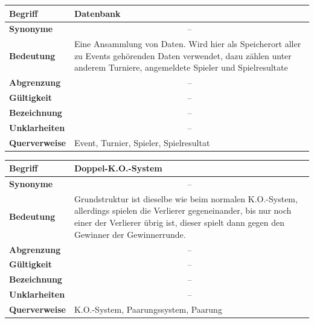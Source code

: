 \documentclass[11pt]{article}
\begin{document}
\begin{tabularx}{\textwidth}{| p{} | p{} |}
	\hline
	\textbf{Begriff} & Datenbank\\
	\hline
	\textbf{Synonyme} & \multicolumn{1}{c|}{--} \\
	\hline
	\textbf{Bedeutung} & Eine Ansammlung von Daten. Wird hier als Speicherort aller zu Events gehörenden Daten verwendet, dazu zählen unter anderem Turniere, angemeldete Spieler und Spielresultate\\
	\hline
	\textbf{Abgrenzung} & \multicolumn{1}{c|}{--} \\
	\hline
	\textbf{Gültigkeit} & \multicolumn{1}{c|}{--} \\
	\hline
	\textbf{Bezeichnung} & \multicolumn{1}{c|}{--} \\
	\hline
	\textbf{Unklarheiten} & \multicolumn{1}{c|}{--} \\
	\hline
	\textbf{Querverweise} & Event, Turnier, Spieler, Spielresultat\\
	\hline
\end{tabularx}

\newpage

\begin{tabularx}{\textwidth}{| p{} | p{} |}
	\hline
	\textbf{Begriff} & Doppel-K.O.-System\\ 
	\hline
	\textbf{Synonyme} & \multicolumn{1}{c|}{--}\\
	\hline 
	\textbf{Bedeutung} & Grundstruktur ist dieselbe wie beim normalen K.O.-System, allerdings spielen die Verlierer gegeneinander, bis nur noch einer der Verlierer übrig ist, dieser spielt dann gegen den Gewinner der Gewinnerrunde.\\
	\hline
	\textbf{Abgrenzung} & \multicolumn{1}{c|}{--}\\
	\hline
	\textbf{Gültigkeit} & \multicolumn{1}{c|}{--}\\
	\hline
	\textbf{Bezeichnung} & \multicolumn{1}{c|}{--}\\
	\hline
	\textbf{Unklarheiten} & \multicolumn{1}{c|}{--} \\
	\hline
	\textbf{Querverweise} & K.O.-System, Paarungssystem, Paarung\\
	\hline
\end{tabularx}
\end{document}

